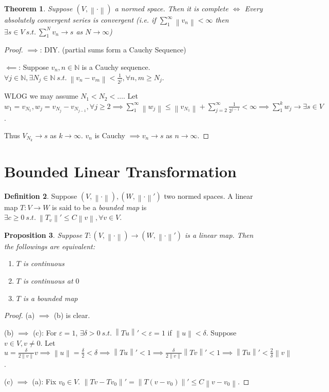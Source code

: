 \documentclass{report}
\newcommand{\N}{\mathbb{N}}
\newcommand{\st}{\ s.t.\ }
\newcommand{\norm}[1]{\left\| #1 \right\|}
\newtheorem{theorem}{Theorem}[chapter]
\newtheorem{proposition}[theorem]{Proposition}
\theoremstyle{definition}
\newtheorem{definition}[theorem]{Definition}
\theoremstyle{remark}
\begin{document}
\begin{theorem}
	Suppose $(V, \norm{\cdot})$ a normed space. Then it is complete $\iff$ Every absolutely convergent series is convergent (i.e. if $\sum_{1}^\infty \norm{v_n} < \infty$ then $\exists s \in V \st \sum_{1}^N v_n \to s$ as $N \to \infty$)
\end{theorem}
\begin{proof}
	$\implies$: DIY. (partial sums form a Cauchy Sequence)

	$\impliedby$: Suppose $v_n, n \in \N$ is a Cauchy sequence. $\forall j \in \N, \exists N_j \in \N \st \norm{v_n - v_m} < \frac{1}{2^j}, \forall n, m \geq N_j$.

	WLOG we may assume $N_1 < N_2 < \ldots$. Let $w_1 = v_{N_1}, w_j = v_{N_j} - v_{N_{j-1}}, \forall j \geq 2 \implies \sum_{1}^\infty \norm{w_j} \leq \norm{v_{N_1}} + \sum_{j=2}^\infty \frac{1}{2^{j-1}} < \infty \implies \sum_{1}^k w_j \to \exists s \in V$.
	
	Thus $V_{N_{k}} \to s$ as $k \to \infty$. $v_n$ is Cauchy $\implies v_n \to s$ as $n \to \infty$.
\end{proof}

\section{Bounded Linear Transformation}
\begin{definition}
	Suppose $(V, \norm{\cdot}), (W, \norm{\cdot}')$ two normed spaces. A linear map $T: V \to W$ is said to be a \emph{bounded map} is $\exists c \geq 0 \st \norm{T_v}' \leq C\norm{v}, \forall v \in V$.
\end{definition}
\begin{proposition}
	Suppose $T: (V, \norm{\cdot}) \to (W, \norm{\cdot}')$ is a linear map. Then the followings are equivalent:
	\begin{enumerate}
		\item $T$ is continuous
		\item $T$ is continuous at $0$
		\item $T$ is a bounded map
	\end{enumerate}
\end{proposition}
\begin{proof}
	(a) $\implies$ (b) is clear.

	(b) $\implies$ (c): For $\varepsilon = 1$, $\exists \delta > 0 \st \norm{Tu}' < \varepsilon = 1$ if $\norm{u} < \delta$. Suppose $v \in V, v \neq 0$. Let $u = \frac{\delta}{2\norm{v}}v \implies \norm{u} = \frac{\delta}{2} < \delta \implies \norm{Tu}' < 1 \implies \frac{\delta}{2\norm{v}}\norm{Tv}' < 1 \implies \norm{Tu}' < \frac{2}{\delta}\norm{v}$.

	(c) $\implies$ (a): Fix $v_0 \in V$. $\norm{Tv - Tv_0}' = \norm{T(v - v_0)}' \leq C\norm{v - v_0}$.
\end{proof}
\end{document}
